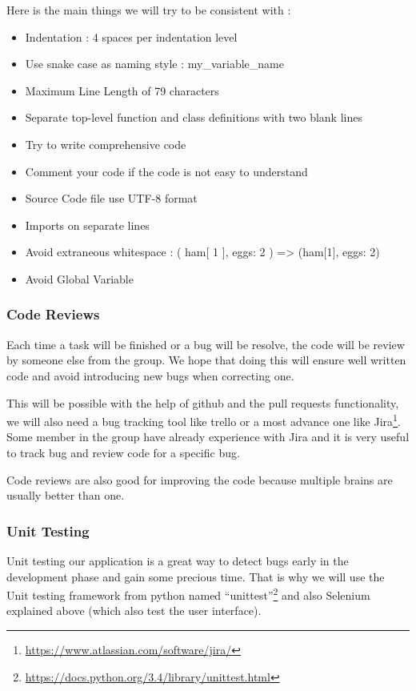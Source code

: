 \documentclass[11pt, a4paper]{article}   	%
\begin{document}
Here is the main things we will try to be consistent with : 

\begin{itemize}
\item Indentation : 4 spaces per indentation level
\item Use snake case as naming style : my\_variable\_name
\item Maximum Line Length of 79 characters
\item Separate top-level function and class definitions with two blank lines
\item Try to write comprehensive code
\item Comment your code if the code is not easy to understand
\item Source Code file use UTF-8 format
\item Imports on separate lines
\item Avoid extraneous whitespace : ( ham[ 1 ], { eggs: 2 } ) => (ham[1], {eggs: 2})
\item Avoid Global Variable
\end{itemize} 


\subsubsection{Code Reviews}
	
Each time a task will be finished or a bug will be resolve, the code will be review by someone else from the group. 
We hope that doing this will ensure well written code and avoid introducing new bugs when correcting one.  
 
This will be possible with the help of github and the pull requests functionality, we will also need a bug tracking tool like trello or a most advance one like Jira\footnote{\url{https://www.atlassian.com/software/jira/}}. Some member in the group have already experience with Jira and it is very useful to track bug and review code for a specific bug. 
 
Code reviews are also good for improving the code because multiple brains are usually better than one. 
 
\subsubsection{Unit Testing} 
 
Unit testing our application is a great way to detect bugs early in the development phase and gain some precious time. That is why we will use the Unit testing framework from python named \enquote{unittest}\footnote{\url{https://docs.python.org/3.4/library/unittest.html}} and also Selenium explained above (which also test the user interface). 
 
\end{document}
